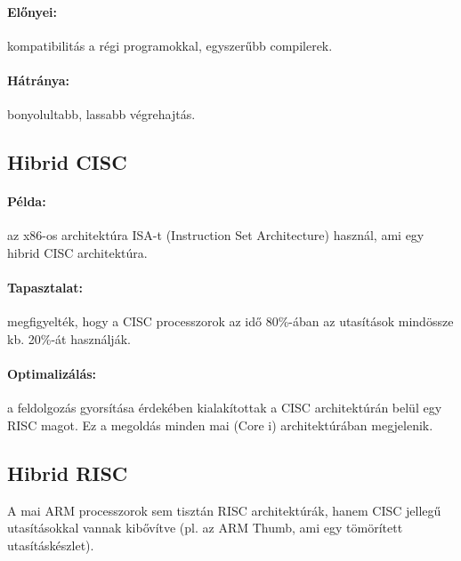 \paragraph{Előnyei:} kompatibilitás a régi programokkal, egyszerűbb compilerek.
\paragraph{Hátránya:} bonyolultabb, lassabb végrehajtás.

\subsection{Hibrid CISC}
\paragraph{Példa:} az x86-os architektúra ISA-t (Instruction Set Architecture) használ, ami egy hibrid CISC architektúra.
\paragraph{Tapasztalat:} megfigyelték, hogy a CISC processzorok az idő 80\%-ában az utasítások mindössze kb. 20\%-át használják.
\paragraph{Optimalizálás:} a feldolgozás gyorsítása érdekében kialakítottak a CISC architektúrán belül egy RISC magot.
Ez a megoldás minden mai (Core i) architektúrában megjelenik.

\subsection{Hibrid RISC}
A mai ARM processzorok sem tisztán RISC architektúrák, hanem CISC jellegű utasításokkal vannak kibővítve (pl. az ARM Thumb, ami egy tömörített utasításkészlet).